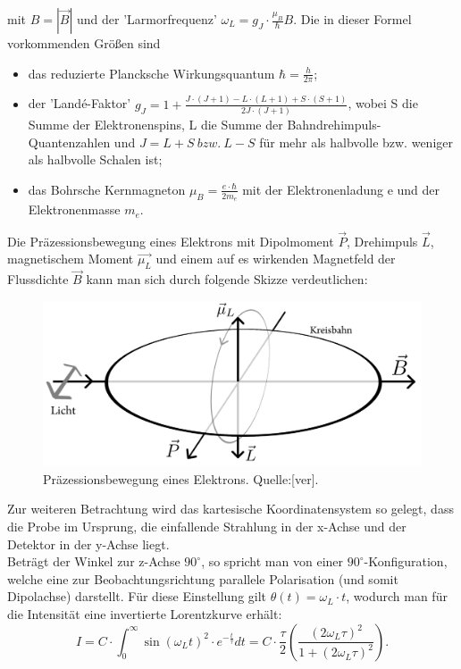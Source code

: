 mit $B=\left|\vec{B}\right|$ und der 'Larmorfrequenz' $\omega_{L}=g_{J}\cdot\frac{\mu_{B}}{\hbar}B$. Die in dieser Formel vorkommenden Größen sind
\begin{itemize}
\item das reduzierte Plancksche Wirkungsquantum $\hbar=\frac{h}{2\pi}$;
\item der 'Landé-Faktor' $g_{J}=1+\frac{J\cdot(J+1)-L\cdot(L+1)+S\cdot(S+1)}{2J\cdot(J+1)}$, wobei S die Summe der Elektronenspins, L die Summe der Bahndrehimpuls-Quantenzahlen und $J=L+S~bzw.~L-S$ für mehr als halbvolle bzw. weniger als halbvolle Schalen ist;
\item das Bohrsche Kernmagneton $\mu_{B}=\frac{e\cdot\hbar}{2m_{e}}$ mit der Elektronenladung e und der Elektronenmasse $m_{e}$.
\end{itemize}
Die Präzessionsbewegung eines Elektrons mit Dipolmoment $\vec{P}$, Drehimpuls $\vec{L}$, magnetischem Moment $\vec{\mu_{L}}$ und einem auf es wirkenden Magnetfeld der Flussdichte $\vec{B}$ kann man sich durch folgende Skizze verdeutlichen:
\begin{center}
\begin{figure}[h]
\includegraphics[scale=0.3]{Bilder/praezession}
\caption{Präzessionsbewegung eines Elektrons. Quelle:[ver].}
\end{figure}
\end{center}
Zur weiteren Betrachtung wird das kartesische Koordinatensystem so gelegt, dass die Probe im Ursprung, die einfallende Strahlung in der x-Achse und der Detektor in der y-Achse liegt. \\
Beträgt der Winkel zur z-Achse $90^{\circ}$, so spricht man von einer $90^{\circ}$-Konfiguration, welche eine zur Beobachtungsrichtung parallele Polarisation (und somit Dipolachse) darstellt. Für diese Einstellung gilt $\theta(t)=\omega_{L}\cdot t$, wodurch man für die Intensität eine invertierte Lorentzkurve erhält: \[I=C\cdot\int_{0}^{\infty}\sin(\omega_{L}t)^{2}\cdot e^{-\frac{t}{\tau}}dt=C\cdot\frac{\tau}{2}\left(\frac{(2\omega_{L}\tau)^{2}}{1+(2\omega_{L}\tau)^{2}}\right).\]
